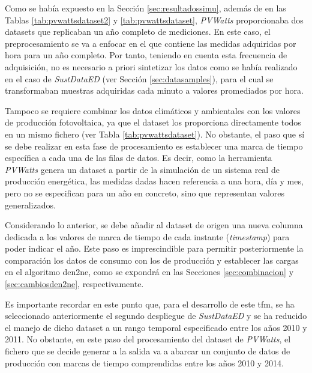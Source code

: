Como se había expuesto en la Sección \ref{sec:resultadossimu}, además de en las Tablas \ref{tab:pvwattsdataset2} y \ref{tab:pvwattsdataset}, \textit{PVWatts} proporcionaba dos datasets que replicaban un año completo de mediciones. En este caso, el preprocesamiento se va a enfocar en el que contiene las medidas adquiridas por hora para un año completo. Por tanto, teniendo en cuenta esta frecuencia de adquisición, no es necesario a priori sintetizar los datos como se había realizado en el caso de \textit{SustDataED} (ver Sección \ref{sec:datasamples}), para el cual se transformaban muestras adquiridas cada minuto a valores promediados por hora.

\vspace{3mm}

Tampoco se requiere combinar los datos climáticos y ambientales con los valores de producción fotovoltaica, ya que el dataset los proporciona directamente todos en un mismo fichero (ver Tabla \ref{tab:pvwattsdataset}). No obstante, el paso que sí se debe realizar en esta fase de procesamiento es establecer una marca de tiempo específica a cada una de las filas de datos. Es decir, como la herramienta \textit{PVWatts} genera un dataset a partir de la simulación de un sistema real de producción energética, las medidas dadas hacen referencia a una hora, día y mes, pero no se especifican para un año en concreto, sino que representan valores generalizados. 

\vspace{3mm}

Considerando lo anterior, se debe añadir al dataset de origen una nueva columna dedicada a los valores de marca de tiempo de cada instante (\textit{timestamp}) para poder indicar el año. Este paso es imprescindible para permitir posteriormente la comparación los datos de consumo con los de producción y establecer las cargas en el algoritmo \gls{den2ne}, como se expondrá en las Secciones \ref{sec:combinacion} y \ref{sec:cambiosden2ne}, respectivamente. 

\vspace{3mm}

Es importante recordar en este punto que, para el desarrollo de este \gls{tfm}, se ha seleccionado anteriormente el segundo despliegue de \textit{SustDataED} y se ha reducido el manejo de dicho dataset a un rango temporal especificado entre los años 2010 y 2011. No obstante, en este paso del procesamiento del dataset de \textit{PVWatts}, el fichero que se decide generar a la salida va a abarcar un conjunto de datos de producción con marcas de tiempo comprendidas entre los años 2010 y 2014. 

